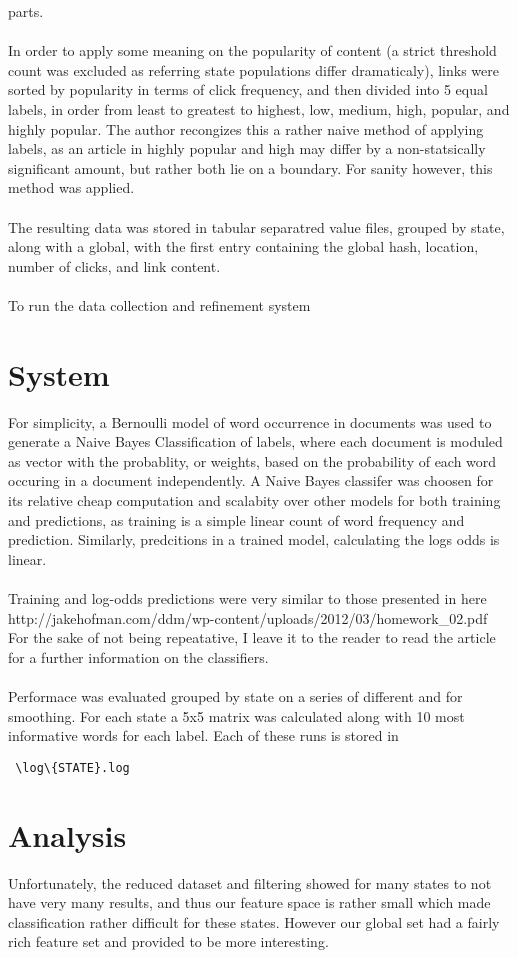 \documentclass[11pt]{article}
\begin{document}
parts. \\
\\
In order to apply some meaning on the popularity of content (a strict threshold 
count was excluded as referring state populations differ dramaticaly), links 
were sorted by popularity in terms of click frequency, and then divided into 5
equal labels, in order from least to greatest to highest, low, medium, high, 
popular, and highly popular. The author recongizes this a rather 
naive method of applying labels, as an article in highly popular and high may 
differ by a non-statsically significant amount, but rather both lie on a 
boundary.  For sanity however, this method was applied.\\
\\
The resulting data was stored in tabular separatred value files, grouped by 
state, along with a global, with the first entry containing the global hash, location, number of 
clicks, and link content.\\ 
\\
To run the data collection and refinement system
\section{System}
For simplicity, a Bernoulli model of word occurrence in documents was used to 
generate a Naive Bayes Classification of labels, where each document is moduled 
as vector with the probablity, or weights, based on the probability of each 
word occuring in a document independently.  A Naive Bayes classifer was choosen 
for its relative cheap computation and scalabity over other models for both 
training and predictions, as training is a simple linear count of word 
frequency and prediction. Similarly, predcitions in a trained model, calculating
the logs odds is linear.\\
\\
Training and log-odds predictions were very similar to those presented in here
http://jakehofman.com/ddm/wp-content/uploads/2012/03/homework_02.pdf
For the sake of not being repeatative, I leave it to the reader to read the 
article for a further information on the classifiers.\\
\\
Performace was evaluated grouped by state on a series of different \alpha and 
\beta for smoothing.  For each state a 5x5 matrix was calculated along with 
10 most informative words for each label. Each of these runs is stored in
\begin{verbatim} \log\{STATE}.log \end{verbatim} 
\section{Analysis}
Unfortunately, the reduced dataset and filtering showed for many states to not 
have very many results, and thus our feature space is rather small which made
classification rather difficult for these states.  However our global set 
had a fairly rich feature set and provided to be more interesting.
\end{document}
